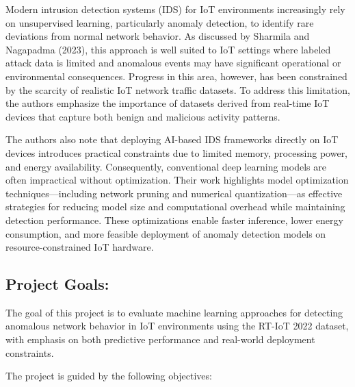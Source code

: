 \documentclass[
  letterpaper,
  DIV=11,
  numbers=noendperiod]{scrartcl}
\begin{document}
Modern intrusion detection systems (IDS) for IoT environments
increasingly rely on unsupervised learning, particularly anomaly
detection, to identify rare deviations from normal network behavior. As
discussed by Sharmila and Nagapadma (2023), this approach is well suited
to IoT settings where labeled attack data is limited and anomalous
events may have significant operational or environmental consequences.
Progress in this area, however, has been constrained by the scarcity of
realistic IoT network traffic datasets. To address this limitation, the
authors emphasize the importance of datasets derived from real-time IoT
devices that capture both benign and malicious activity patterns.

The authors also note that deploying AI-based IDS frameworks directly on
IoT devices introduces practical constraints due to limited memory,
processing power, and energy availability. Consequently, conventional
deep learning models are often impractical without optimization. Their
work highlights model optimization techniques---including network
pruning and numerical quantization---as effective strategies for
reducing model size and computational overhead while maintaining
detection performance. These optimizations enable faster inference,
lower energy consumption, and more feasible deployment of anomaly
detection models on resource-constrained IoT hardware.

\subsection{Project Goals:}\label{project-goals}

The goal of this project is to evaluate machine learning approaches for
detecting anomalous network behavior in IoT environments using the
RT-IoT 2022 dataset, with emphasis on both predictive performance and
real-world deployment constraints.

The project is guided by the following objectives:
\end{document}
